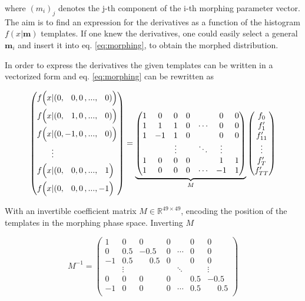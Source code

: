 where $(m_i)_j$ denotes the j-th component of the i-th morphing parameter vector. The aim is to find an expression for the derivatives as a function of the histogram $f(x|\mathbf{m})$ templates. If one knew the derivatives, one could easily select a general $\mathbf{m}_i$ and insert it into eq. \ref{eq:morphing}, to obtain the morphed distribution.

In order to express the derivatives the given templates can be written in a vectorized form and eq. \ref{eq:morphing} can be rewritten as

\begin{equation*}
	\left(\begin{aligned}
		f\Bigl(x &| (0,\phantom{-}0, 0\,,...,\phantom{-}0)\Bigl) \\
		f\Bigl(x &| (0,\phantom{-}1, 0\,,...,\phantom{-}0)\Bigl) \\
		f\Bigl(x &| (0,-1, 0\,,...,\phantom{-}0)\Bigl) \\
		&\vdots \\
		f\Bigl(x &| (0,\phantom{-}0, 0\,,...,\phantom{-}1\Bigl) \\
		f\Bigl(x &| (0,\phantom{-}0, 0\,,...,-1\Bigl) \\
	\end{aligned}\right) = \underbrace{\left(\begin{matrix}
		1 & 0 & 0 & 0 & & 0 & 0 \\
		1 & 1 & 1 & 0 &  \cdots & 0 & 0 \\
		1 & -1 & 1 & 0 &      & 0 & 0 \\
		& & \vdots & & \ddots & \vdots & \\
		1 & 0 & 0 & 0 &       & 1 & 1 \\
		1 & 0 & 0 & 0 & \cdots & -1 & 1 \\
	\end{matrix}\right)}_{M} \left(\begin{matrix}
	f_0 \\
	f'_1 \\
	f'_{11} \\
	\vdots \\
	f'_T \\
	f'_{TT}
\end{matrix}\right)
\end{equation*}

With an invertible coefficient matrix $M \in \mathbb{R}^{49\times49}$, encoding the position of the templates in the morphing phase space. Inverting $M$

\begin{equation*}
	M^{-1} = \left(\begin{matrix}
		 1 & 0   & 0   & 0 &        & 0 & 0 \\
		 0 & 0.5 &-0.5 & 0 & \cdots & 0 & 0 \\
		-1 & 0.5 &\phantom{-}0.5 & 0 &        & 0 & 0 \\
		   & \vdots &     &    & \ddots &  & \vdots \\
		 0 & 0   & 0   & 0 &        & 0.5 & -0.5 \\
		-1 & 0   & 0   & 0 & \cdots & 0.5 & \phantom{-}0.5 \\
	\end{matrix}\right)
\end{equation*}

